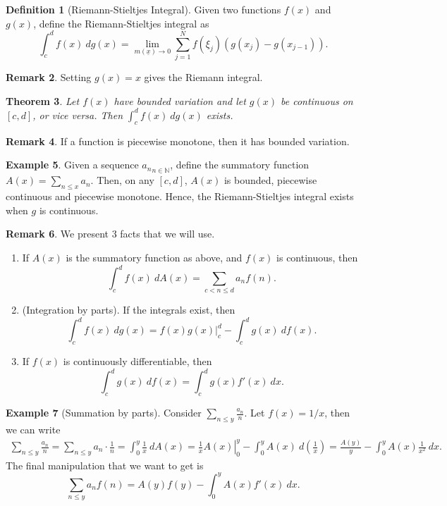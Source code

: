 \documentclass[11pt]{article}
\newtheorem{thm}{Theorem}[section]
\theoremstyle{definition}
\newtheorem{defn}[thm]{Definition}
\newtheorem{example}[thm]{Example}
\newtheorem{remark}[thm]{Remark}
\newcommand{\NN}{\mathbb{N}}
\begin{document}
\begin{defn}[Riemann-Stieltjes Integral]
Given two functions $f(x)$ and $g(x)$, define the Riemann-Stieltjes integral as
\[
  \int_c^df(x)~dg(x) = \lim_{m(\underline{x})\to0} \sum_{j=1}^N
  f(\xi_j)(g(x_j)-g(x_{j-1})) .
\]
\end{defn}

\begin{remark}
Setting $g(x)=x$ gives the Riemann integral.
\end{remark}

\begin{thm}
Let $f(x)$ have bounded variation and let $g(x)$ be continuous on $[c,d]$, or vice versa.
Then $\int_c^df(x)~dg(x)$ exists.
\end{thm}

\begin{remark}
If a function is piecewise monotone, then it has bounded variation.
\end{remark}

\begin{example}
Given a sequence ${a_n}_{n\in\NN}$, define the summatory function $A(x)=\sum_{n\le x}a_n$.
Then, on any $[c,d]$, $A(x)$ is bounded, piecewise continuous and piecewise monotone.
Hence, the Riemann-Stieltjes integral exists when $g$ is continuous.
\end{example}

\begin{remark}
We present 3 facts that we will use.
\begin{enumerate}
\item If $A(x)$ is the summatory function as above, and $f(x)$ is continuous, then
\[
  \int_c^d f(x) ~dA(x) = \sum_{c<n\le d} a_nf(n) .
\]
\item (Integration by parts). If the integrals exist, then
\[
  \int_c^d f(x) ~dg(x) = \left.f(x)g(x)\right|_c^d - \int_c^d g(x) ~df(x) .
\]
\item If $f(x)$ is continuously differentiable, then
\[
  \int_c^d g(x) ~df(x) = \int_c^d g(x)f'(x) ~dx .
\]
\end{enumerate}
\end{remark}

\begin{example}[Summation by parts]
Consider $\sum_{n\le y}\frac{a_n}n$. Let $f(x)=1/x$, then we can write
\begin{multline*}
\sum_{n\le y} \frac{a_n}n
= \sum_{n\le y} a_n\cdot\frac1n = \int_0^y \frac1x ~dA(x)
= \left.\frac1xA(x)\right|_0^y - \int_0^y A(x) ~d\left(\frac1x\right)
= \frac{A(y)}y - \int_0^y A(x)\frac1{x^2} ~dx .
\end{multline*}
The final manipulation that we want to get is
\begin{equation}
\sum_{n\le y} a_nf(n) = A(y)f(y) - \int_0^y A(x)f'(x) ~dx .
\label{summation by parts}
\end{equation}
\end{example}
\end{document}
